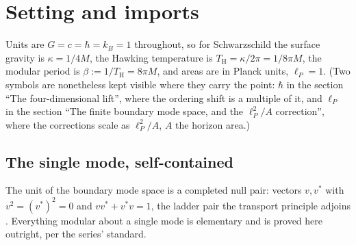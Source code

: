 \documentclass[11pt]{article}
\theoremstyle{definition}
\theoremstyle{plain}
\providecommand{\TH}{}\renewcommand{\TH}{T_{\mathrm{H}}}
\begin{document}
\section{Setting and imports}

\label{c:note.hawking.setting-setting-imports}
Units are $G = c = \hbar = k_B = 1$ throughout, so for Schwarzschild the surface gravity is $\kappa = 1/4M$, the Hawking temperature is $\TH = \kappa/2\pi = 1/8\pi M$, the modular period is $\beta := 1/\TH = 8\pi M$, and areas are in Planck units, $\ell_P = 1$. (Two symbols are nonetheless kept visible where they carry the point: $\hbar$ in the section ``The four-dimensional lift'', where the ordering shift is a multiple of it, and $\ell_P$ in the section ``The finite boundary mode space, and the $\ell_P^2/A$ correction'', where the corrections scale as $\ell_P^2/A$, $A$ the horizon area.)

\subsection*{The single mode, self-contained}
\label{c:note.hawking.setting-single-mode-self-contained}
The unit of the boundary mode space is a completed null pair: vectors $v, v^*$ with $v^2 = (v^*)^2 = 0$ and $vv^* + v^*v = 1$, the ladder pair the transport principle adjoins \cite{ButlerT1}. Everything modular about a single mode is elementary and is proved here outright, per the series' standard.
\end{document}
